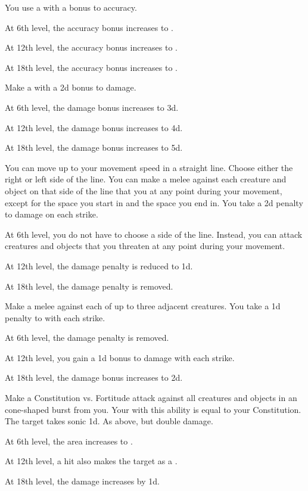 {             You use a  with a  bonus to accuracy.
            \par At 6th level, the accuracy bonus increases to .
            \par At 12th level, the accuracy bonus increases to .
            \par At 18th level, the accuracy bonus increases to .

             Make a  with a \plus2d bonus to damage.
            \par At 6th level, the damage bonus increases to \plus3d.
            \par At 12th level, the damage bonus increases to \plus4d.
            \par At 18th level, the damage bonus increases to \plus5d.

             You can move up to your movement speed in a straight line.
            Choose either the right or left side of the line.
            You can make a melee  against each creature and object on that side of the line that you  at any point during your movement, except for the space you start in and the space you end in.
            You take a \minus2d penalty to damage on each strike.
            \par At 6th level, you do not have to choose a side of the line.
            Instead, you can attack creatures and objects that you threaten at any point during your movement.
            \par At 12th level, the damage penalty is reduced to \minus1d.
            \par At 18th level, the damage penalty is removed.

             Make a melee  against each of up to three adjacent creatures.
            You take a \minus1d penalty to  with each strike.
            \par At 6th level, the damage penalty is removed.
            \par At 12th level, you gain a \plus1d bonus to damage with each strike.
            \par At 18th level, the damage bonus increases to \plus2d.

             Make a Constitution vs. Fortitude attack against all creatures and objects in an \areamed cone-shaped burst from you.
            Your  with this ability is equal to your Constitution.
             The target takes sonic  \minus1d.
             As above, but double damage.
            \par At 6th level, the area increases to \arealarge.
            \par At 12th level, a hit also makes the target  as a .
            \par At 18th level, the damage increases by \plus1d.

}
